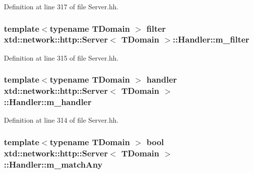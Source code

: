 Definition at line 317 of file Server.\-hh.

\hypertarget{classxtd_1_1network_1_1http_1_1Server_1_1Handler_ab5e28c0cb7e750a4d2e0307f99839f8e}{
\subsubsection[{m\-\_\-filter}]{\setlength{\rightskip}{0pt plus 5cm}template$<$typename T\-Domain $>$ {\bf filter} {\bf xtd\-::network\-::http\-::\-Server}$<$ T\-Domain $>$\-::Handler\-::m\-\_\-filter}}\label{classxtd_1_1network_1_1http_1_1Server_1_1Handler_ab5e28c0cb7e750a4d2e0307f99839f8e}


Definition at line 315 of file Server.\-hh.

\hypertarget{classxtd_1_1network_1_1http_1_1Server_1_1Handler_a47ad1d68c7d28ffbcbd10671aee30230}{
\subsubsection[{m\-\_\-handler}]{\setlength{\rightskip}{0pt plus 5cm}template$<$typename T\-Domain $>$ {\bf handler} {\bf xtd\-::network\-::http\-::\-Server}$<$ T\-Domain $>$\-::Handler\-::m\-\_\-handler}}\label{classxtd_1_1network_1_1http_1_1Server_1_1Handler_a47ad1d68c7d28ffbcbd10671aee30230}


Definition at line 314 of file Server.\-hh.

\hypertarget{classxtd_1_1network_1_1http_1_1Server_1_1Handler_a158d5f20d2ae084fecb125af037f5b71}{
\subsubsection[{m\-\_\-match\-Any}]{\setlength{\rightskip}{0pt plus 5cm}template$<$typename T\-Domain $>$ bool {\bf xtd\-::network\-::http\-::\-Server}$<$ T\-Domain $>$\-::Handler\-::m\-\_\-match\-Any}}\label{classxtd_1_1network_1_1http_1_1Server_1_1Handler_a158d5f20d2ae084fecb125af037f5b71}


